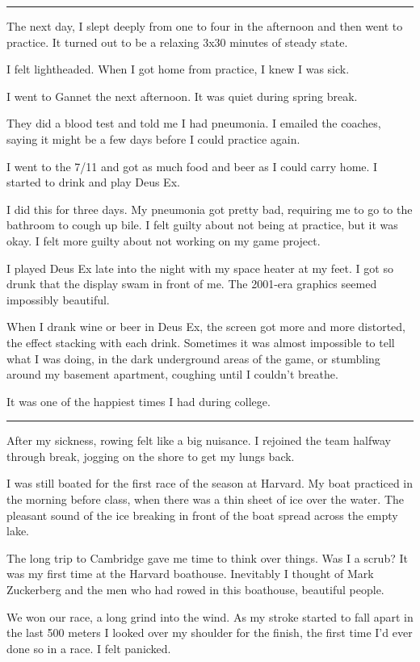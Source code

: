 \plainfancybreak{12pt}{2}{* * *}

The next day, I slept deeply from one to four in the afternoon and then went to
practice.  It turned out to be a relaxing 3x30 minutes of steady state.  

I felt lightheaded.  When I got home from practice, I knew I was sick.  

I went to Gannet the next afternoon.  It was quiet during spring break.

They did a blood test and told me I had pneumonia.  I emailed the coaches,
saying it might be a few days before I could practice again.

I went to the 7/11 and got as much food and beer as I could carry home.  I
started to drink and play Deus Ex.  

I did this for three days.  My pneumonia got pretty bad, requiring me to go to
the bathroom to cough up bile.  I felt guilty about not being at practice, but
it was okay.  I felt more guilty about not working on my game project. 
 
I played Deus Ex late into the night with my space heater at my feet.  I got so
drunk that the display swam in front of me.  The 2001-era graphics seemed
impossibly beautiful.  

When I drank wine or beer in Deus Ex, the screen got more and more distorted,
the effect stacking with each drink.  Sometimes it was almost impossible to tell
what I was doing, in the dark underground areas of the game, or stumbling around
my basement apartment, coughing until I couldn't breathe.

It was one of the happiest times I had during college.

\plainfancybreak{12pt}{2}{* * *}

After my sickness, rowing felt like a big nuisance.  I rejoined the team halfway
through break, jogging on the shore to get my lungs back.  

I was still boated for the first race of the season at Harvard.  My boat
practiced in the morning before class, when there was a thin sheet of ice over
the water.   The pleasant sound of the ice breaking in front of the boat spread
across the empty lake.
 
The long trip to Cambridge gave me time to think over things.  Was I a scrub?
It was my first time at the Harvard boathouse.  Inevitably I thought of Mark
Zuckerberg and the men who had rowed in this boathouse, beautiful people. 

We won our race, a long grind into the wind.  As my stroke started to fall apart
in the last 500 meters I looked over my shoulder for the finish, the first time
I'd ever done so in a race.  I felt panicked.

